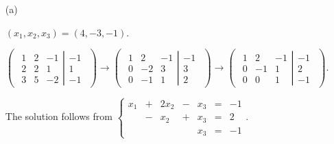 \begin{Exercise}
	\begin{enumerate}[(a)]
		\item[(a)]
		\begin{answer}
			$(x_1,x_2,x_3) = (4,-3,-1)$.
		\end{answer}
		\begin{solution}
			$\begin{pmatrix} \left.\begin{matrix}
			1 & 2 & -1 \\
			2 & 2 & 1 \\
			3 & 5 & -2
			\end{matrix} \right| \begin{matrix}
			-1 \\
			1 \\
			-1
			\end{matrix} \end{pmatrix} \longrightarrow \begin{pmatrix} \left.\begin{matrix}
			1 & 2 & -1 \\
			0 & -2 & 3 \\
			0 & -1 & 1
			\end{matrix} \right| \begin{matrix}
			-1 \\
			3 \\
			2
			\end{matrix} \end{pmatrix} \longrightarrow \begin{pmatrix} \left.\begin{matrix}
			1 & 2 & -1 \\
			0 & -1 & 1 \\
			0 & 0 & 1
			\end{matrix} \right| \begin{matrix}
			-1 \\
			2 \\
			-1
			\end{matrix} \end{pmatrix}$. 
			
			The solution follows from
			$\left\{\begin{array}{rrrrrrrr}
			x_1 &+&2x_2&-&x_3 &=& -1 \\
			&-&x_2&+&x_3 &=& 2 \\
			& & & &x_3 &=& -1
			\end{array}\right.$. 
		\end{solution}
		

\end{enumerate}
\end{Exercise}
